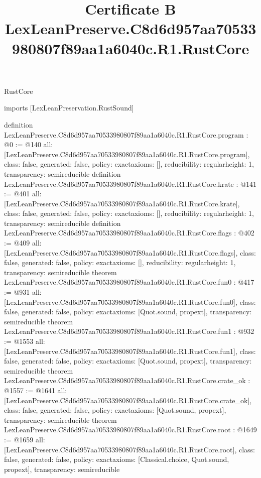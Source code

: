 \begin{lexlean}{RustCore}
\title{Certificate B LexLeanPreserve.C8d6d957aa70533980807f89aa1a6040c.R1.RustCore}
\begin{coremodule}
imports [LexLeanPreservation.RustSound]

definition LexLeanPreserve.C8d6d957aa70533980807f89aa1a6040c.R1.RustCore.program : @0 := @140 {
  all: [LexLeanPreserve.C8d6d957aa70533980807f89aa1a6040c.R1.RustCore.program],
  class: false,
  generated: false,
  policy: exact{axioms: []},
  reducibility: regular{height: 1},
  transparency: semireducible
}
definition LexLeanPreserve.C8d6d957aa70533980807f89aa1a6040c.R1.RustCore.krate : @141 := @401 {
  all: [LexLeanPreserve.C8d6d957aa70533980807f89aa1a6040c.R1.RustCore.krate],
  class: false,
  generated: false,
  policy: exact{axioms: []},
  reducibility: regular{height: 1},
  transparency: semireducible
}
definition LexLeanPreserve.C8d6d957aa70533980807f89aa1a6040c.R1.RustCore.flags : @402 := @409 {
  all: [LexLeanPreserve.C8d6d957aa70533980807f89aa1a6040c.R1.RustCore.flags],
  class: false,
  generated: false,
  policy: exact{axioms: []},
  reducibility: regular{height: 1},
  transparency: semireducible
}
theorem LexLeanPreserve.C8d6d957aa70533980807f89aa1a6040c.R1.RustCore.fun0 : @417 := @931 {
  all: [LexLeanPreserve.C8d6d957aa70533980807f89aa1a6040c.R1.RustCore.fun0],
  class: false,
  generated: false,
  policy: exact{axioms: [Quot.sound, propext]},
  transparency: semireducible
}
theorem LexLeanPreserve.C8d6d957aa70533980807f89aa1a6040c.R1.RustCore.fun1 : @932 := @1553 {
  all: [LexLeanPreserve.C8d6d957aa70533980807f89aa1a6040c.R1.RustCore.fun1],
  class: false,
  generated: false,
  policy: exact{axioms: [Quot.sound, propext]},
  transparency: semireducible
}
theorem LexLeanPreserve.C8d6d957aa70533980807f89aa1a6040c.R1.RustCore.crate_ok : @1557 := @1641 {
  all: [LexLeanPreserve.C8d6d957aa70533980807f89aa1a6040c.R1.RustCore.crate_ok],
  class: false,
  generated: false,
  policy: exact{axioms: [Quot.sound, propext]},
  transparency: semireducible
}
theorem LexLeanPreserve.C8d6d957aa70533980807f89aa1a6040c.R1.RustCore.root : @1649 := @1659 {
  all: [LexLeanPreserve.C8d6d957aa70533980807f89aa1a6040c.R1.RustCore.root],
  class: false,
  generated: false,
  policy: exact{axioms: [Classical.choice, Quot.sound, propext]},
  transparency: semireducible
}


\end{coremodule}
\end{lexlean}
